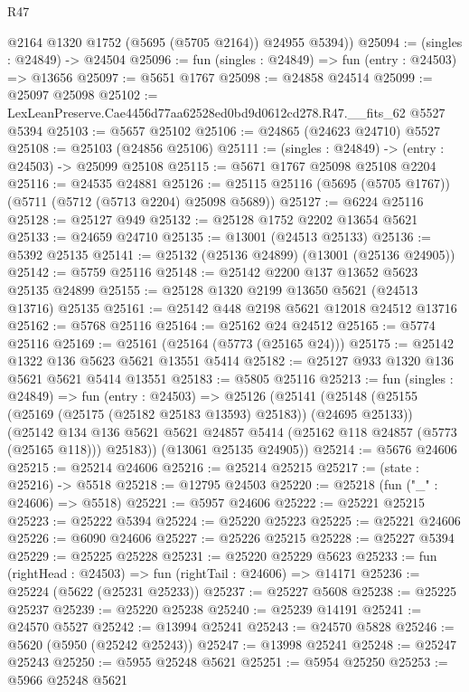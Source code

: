 \begin{lexlean}{R47}
\begin{coremodule}
        @2164
        @1320
        @1752
        (@5695 (@5705 @2164))
        @24955
        @5394))
@25094 := (singles : @24849) -> @24504
@25096 := fun (singles : @24849) => fun (entry : @24503) => @13656
@25097 := @5651 @1767
@25098 := @24858 @24514
@25099 := @25097 @25098
@25102 := LexLeanPreserve.Cae4456d77aa62528ed0bd9d0612cd278.R47.__fits_62 @5527 @5394
@25103 := @5657 @25102
@25106 := @24865 (@24623 @24710) @5527
@25108 := @25103 (@24856 @25106)
@25111 := (singles : @24849) -> (entry : @24503) -> @25099 @25108
@25115 := @5671 @1767 @25098 @25108 @2204
@25116 := @24535 @24881
@25126 := @25115 @25116 (@5695 (@5705 @1767)) (@5711 (@5712 (@5713 @2204) @25098 @5689))
@25127 := @6224 @25116
@25128 := @25127 @949
@25132 := @25128 @1752 @2202 @13654 @5621
@25133 := @24659 @24710
@25135 := @13001 (@24513 @25133)
@25136 := @5392 @25135
@25141 := @25132 (@25136 @24899) (@13001 (@25136 @24905))
@25142 := @5759 @25116
@25148 := @25142 @2200 @137 @13652 @5623 @25135 @24899
@25155 := @25128 @1320 @2199 @13650 @5621 (@24513 @13716) @25135
@25161 := @25142 @448 @2198 @5621 @12018 @24512 @13716
@25162 := @5768 @25116
@25164 := @25162 @24 @24512
@25165 := @5774 @25116
@25169 := @25161 (@25164 (@5773 (@25165 @24)))
@25175 := @25142 @1322 @136 @5623 @5621 @13551 @5414
@25182 := @25127 @933 @1320 @136 @5621 @5621 @5414 @13551
@25183 := @5805 @25116
@25213 := fun (singles : @24849) =>
  fun (entry : @24503) =>
  @25126
    (@25141
      (@25148
        (@25155 (@25169 (@25175 (@25182 @25183 @13593) @25183)) (@24695 @25133))
        (@25142
          @134
          @136
          @5621
          @5621
          @24857
          @5414
          (@25162 @118 @24857 (@5773 (@25165 @118)))
          @25183))
      (@13061 @25135 @24905))
@25214 := @5676 @24606
@25215 := @25214 @24606
@25216 := @25214 @25215
@25217 := (state : @25216) -> @5518
@25218 := @12795 @24503
@25220 := @25218 (fun ("_" : @24606) => @5518)
@25221 := @5957 @24606
@25222 := @25221 @25215
@25223 := @25222 @5394
@25224 := @25220 @25223
@25225 := @25221 @24606
@25226 := @6090 @24606
@25227 := @25226 @25215
@25228 := @25227 @5394
@25229 := @25225 @25228
@25231 := @25220 @25229 @5623
@25233 := fun (rightHead : @24503) => fun (rightTail : @24606) => @14171
@25236 := @25224 (@5622 (@25231 @25233))
@25237 := @25227 @5608
@25238 := @25225 @25237
@25239 := @25220 @25238
@25240 := @25239 @14191
@25241 := @24570 @5527
@25242 := @13994 @25241
@25243 := @24570 @5828
@25246 := @5620 (@5950 (@25242 @25243))
@25247 := @13998 @25241
@25248 := @25247 @25243
@25250 := @5955 @25248 @5621
@25251 := @5954 @25250
@25253 := @5966 @25248 @5621

\end{coremodule}
\end{lexlean}
